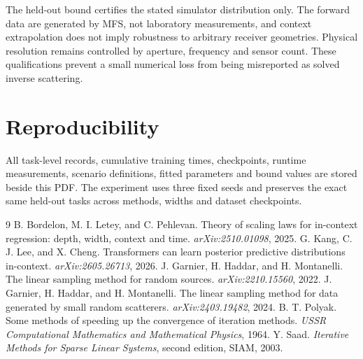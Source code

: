 \documentclass[10pt]{article}
\begin{document}
The held-out bound certifies the stated simulator distribution only.  The
forward data are generated by MFS, not laboratory measurements, and context
extrapolation does not imply robustness to arbitrary receiver geometries.
Physical resolution remains controlled by aperture, frequency and sensor
count.  These qualifications prevent a small numerical loss from being
misreported as solved inverse scattering.

\section{Reproducibility}
All task-level records, cumulative training times, checkpoints, runtime
measurements, scenario definitions, fitted parameters and bound values are
stored beside this PDF.  The experiment uses three fixed seeds and preserves
the exact same held-out tasks across methods, widths and dataset checkpoints.

\begin{thebibliography}{9}
 B. Bordelon, M. I. Letey, and C. Pehlevan.
Theory of scaling laws for in-context regression: depth, width, context and
time. \emph{arXiv:2510.01098}, 2025.
 G. Kang, C. J. Lee, and X. Cheng.
Transformers can learn posterior predictive distributions in-context.
\emph{arXiv:2605.26713}, 2026.
 J. Garnier, H. Haddar, and H. Montanelli.
The linear sampling method for random sources. \emph{arXiv:2210.15560}, 2022.
 J. Garnier, H. Haddar, and H. Montanelli.
The linear sampling method for data generated by small random scatterers.
\emph{arXiv:2403.19482}, 2024.
 B. T. Polyak. Some methods of speeding up the convergence
of iteration methods. \emph{USSR Computational Mathematics and Mathematical
Physics}, 1964.
 Y. Saad. \emph{Iterative Methods for Sparse Linear
Systems}, second edition, SIAM, 2003.
\end{thebibliography}
\end{document}
